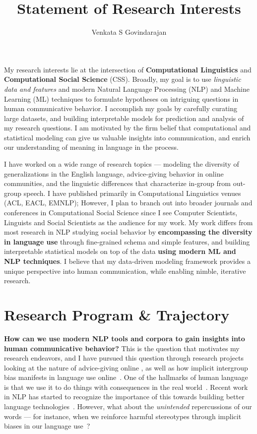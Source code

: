 \documentclass[11pt, letterpaper, biblatex]{practical-report}
\title[]{Statement of Research Interests}
\author{Venkata S Govindarajan}
\date{}
\begin{document}
\maketitle

My research interests lie at the intersection of \textbf{Computational Linguistics} and \textbf{Computational Social Science} (CSS). Broadly, my goal is to use \emph{linguistic data and features} and modern Natural Language Processing (NLP) and Machine Learning (ML) techniques to formulate hypotheses on intriguing questions in human communicative behavior. I accomplish my goals by carefully curating large datasets, and building interpretable models for prediction and analysis of my research questions. I am motivated by the firm belief that computational and statistical modeling can give us valuable insights into communication, and enrich our understanding of meaning in language in the process. 

I have worked on a wide range of research topics --- modeling the diversity of generalizations in the English language, advice-giving behavior in online communities, and the linguistic differences that characterize in-group from out-group speech. I have published primarily in Computational Linguistics venues (ACL, EACL, EMNLP); However, I plan to branch out into broader journals and conferences in Computational Social Science since I see Computer Scientists, Linguists and Social Scientists as the audience for my work. My work differs from most research in NLP studying social behavior by \textbf{encompassing the diversity in language use} through fine-grained schema and simple features, and building interpretable statistical models on top of the data \textbf{using modern ML and NLP techniques}. I believe that my data-driven modeling framework provides a unique perspective into human communication, while enabling nimble, iterative research. 

\section*{Research Program \& Trajectory}

\textbf{How can we use modern NLP tools and corpora to gain insights into human communicative behavior?} This is the question that motivates my research endeavors, and I have pursued this question through research projects looking at the nature of advice-giving online \citep{venkat2020advice}, as well as how implicit intergroup bias manifests in language use online~\citep{govindarajan-etal-2023-people}. One of the hallmarks of human language is that we use it to do things with consequences in the real world~\citep{austin1975things}. Recent work in NLP has started to recognize the importance of this towards building better language technologies~\citep{zellers-etal-2021-turingadvice}. However, what about the \emph{unintended} repercussions of our words --- for instance, when we reinforce harmful stereotypes through implicit biases in our language use~\citep{maass_linguistic_1999}?
\end{document}
